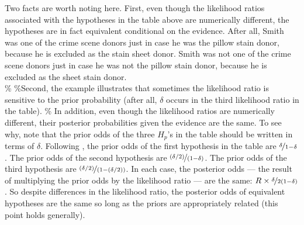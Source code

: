 \documentclass[10pt,dvipsnames,enabledeprecatedfontcommands]{scrartcl}
\begin{document}
Two facts are worth noting here. First, even though the likelihood
ratios associated with the hypotheses in the table above are numerically
different, the hypotheses are in fact equivalent conditional on the
evidence. After all, Smith was one of the crime scene donors just in
case he was the pillow stain donor, because he is excluded as the stain
sheet donor. Smith was not one of the crime scene donors just in case he
was not the pillow stain donor, because he is excluded as the sheet
stain donor.\\
\% \%Second, the example illustrates that sometimes the likelihood ratio
is sensitive to the prior probability (after all, \(\delta\) occurs in
the third likelihood ratio in the table). \% In addition, even though
the likelihood ratios are numerically different, their posterior
probabilities given the evidence are the same. To see why, note that the
prior odds of the three \(H_p\)'s in the table should be written in
terms of \(\delta\). Following \cite{meester2004WhyEffectPriora}, the
prior odds of the first hypothesis in the table are
\(\nicefrac{\delta}{1-\delta}\). The prior odds of the second hypothesis
are \(\nicefrac{(\delta/2)}{(1-\delta)}\). The prior odds of the third
hypothesis are \(\nicefrac{(\delta/2)}{(1-(\delta/2))}\). In each case,
the posterior odds --- the result of multiplying the prior odds by the
likelihood ratio --- are the same:
\(R\times \nicefrac{\delta}{2(1-\delta)}\). So despite differences in
the likelihood ratio, the posterior odds of equivalent hypotheses are
the same so long as the priors are appropriately related (this point
holds generally).
\end{document}
